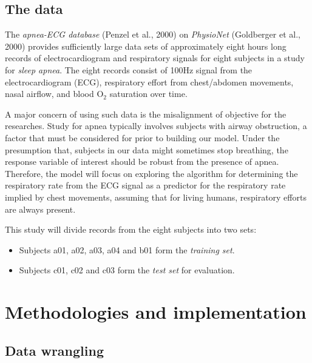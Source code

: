 \documentclass[
]{article}
\providecommand{\tightlist}{%
  \setlength{\itemsep}{0pt}\setlength{\parskip}{0pt}}
\begin{document}
\hypertarget{the-data}{%
\subsection{The data}\label{the-data}}

The \emph{apnea-ECG database} (Penzel et al., 2000) on \emph{PhysioNet}
(Goldberger et al., 2000) provides sufficiently large data sets of
approximately eight hours long records of electrocardiogram and
respiratory signals for eight subjects in a study for \emph{sleep
apnea}. The eight records consist of 100Hz signal from the
electrocardiogram (ECG), respiratory effort from chest/abdomen
movements, nasal airflow, and blood O\(_2\) saturation over time.

A major concern of using such data is the misalignment of objective for
the researches. Study for apnea typically involves subjects with airway
obstruction, a factor that must be considered for prior to building our
model. Under the presumption that, subjects in our data might sometimes
stop breathing, the response variable of interest should be robust from
the presence of apnea. Therefore, the model will focus on exploring the
algorithm for determining the respiratory rate from the ECG signal as a
predictor for the respiratory rate implied by chest movements, assuming
that for living humans, respiratory efforts are always present.

This study will divide records from the eight subjects into two sets:

\begin{itemize}
\tightlist
\item
  Subjects a01, a02, a03, a04 and b01 form the \emph{training set}.
\item
  Subjects c01, c02 and c03 form the \emph{test set} for evaluation.
\end{itemize}

\newpage

\hypertarget{methodologies-and-implementation}{%
\section{Methodologies and
implementation}\label{methodologies-and-implementation}}

\hypertarget{data-wrangling}{%
\subsection{Data wrangling}\label{data-wrangling}}
\end{document}
